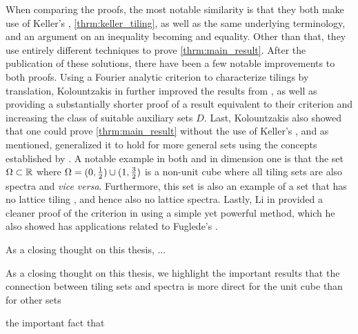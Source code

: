 \documentclass[../thesis.tex]{subfiles}
\begin{document}
When comparing the proofs, the most notable similarity is that they both make use of Keller's , \cref{thrm:keller_tiling}, as well as the same underlying terminology, and an argument on an inequality becoming and equality. Other than that, they use entirely different techniques to prove \cref{thrm:main_result}. After the publication of these solutions, there have been a few notable improvements to both proofs. Using a Fourier analytic criterion to characterize tilings by translation, Kolountzakis in \cite{kolountzakisPackingTilingOrthogonality2000} further improved the results from \cite{lagariasOrthonormalBasesExponentials2000}, as well as providing a substantially shorter proof of a result equivalent to their criterion and increasing the class of suitable auxiliary sets $D$. Last, Kolountzakis also showed that one could prove \cref{thrm:main_result} without the use of Keller's , and as mentioned, generalized it to hold for more general sets using the concepts established by \cite{lagariasOrthonormalBasesExponentials2000}. A notable example in both \cite{lagariasOrthonormalBasesExponentials2000} and \cite{kolountzakisPackingTilingOrthogonality2000} in dimension one is that the set $\Omega\subset \mathbb{R}$ where $\Omega = (0,\frac{1}{2}) \cup  (1,\frac{3}{2})$ is a non-unit cube where all tiling sets are also spectra and \emph{vice versa}. Furthermore, this set is also an example of a set that has no lattice tiling \cite{lagariasTilingLineTranslates1996}, and hence also no lattice spectra. Lastly, Li in \cite{liCharacterizationsSpectraTilings2004}  provided a cleaner proof of the criterion in \cite{kolountzakisPackingTilingOrthogonality2000} using a simple yet powerful method, which he also showed has applications related to Fuglede's . 


As a closing thought on this thesis, ... 

As a closing thought on this thesis, we highlight the important results that the connection between tiling sets and spectra is more direct for the unit cube than for other sets 


the important fact that  





\end{document}
